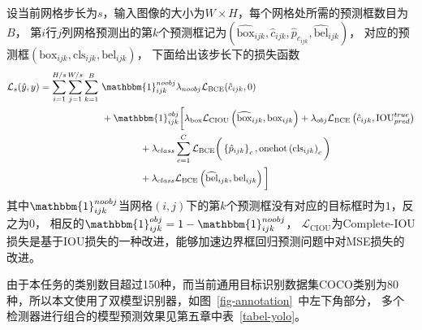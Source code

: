 \begin{definition}[目标识别损失函数]
设当前网格步长为$s$，输入图像的大小为$W\times H$，每个网格处所需的预测框数目为$B$，\vspace{0.5ex}
第$i$行$j$列网格预测出的第$k$个预测框记为$\left(\widehat{\text{box}}_{ijk},\hat{c}_{ijk}, \hat{p}_{c_{ijk}}, \widehat{\text{bel}}_{ijk}\right)$，
对应的预测框$\left(\text{box}_{ijk}, \text{cls}_{ijk}, \text{bel}_{ijk}\right)$，\vspace{0.5ex}
下面给出该步长下的损失函数
\begin{equation}
\begin{aligned}
\mathcal{L}_{s}(\hat{y}, y) = 
\sum_{i=1}^{H/s}\sum_{j=1}^{W/s}\sum_{k=1}^B&\ \mathbbm{1}^{noobj}_{ijk}\lambda_{noobj}\mathcal{L}_{\text{BCE}}(\hat{c}_{ijk},0)\\
&\ +\mathbbm{1}^{obj}_{ijk}\bigg[\lambda_{\text{box}}\mathcal{L}_{\text{CIOU}}\left(\widehat{\text{box}}_{ijk},\text{box}_{ijk}\right)+
\lambda_{obj}\mathcal{L}_{\text{BCE}}\left(\hat{c}_{ijk},\text{IOU}_{pred}^{true}\right)\\
&\ \qquad\qquad+\lambda_{class}\sum_{c=1}^{C}\mathcal{L}_{\text{BCE}}\bigg(\left\{\hat{p}_{ijk}\right\}_c, \text{onehot}\left(\text{cls}_{ijk}\right)_c\bigg)\\
&\ \qquad\qquad+\lambda_{class}\mathcal{L}_{\text{BCE}}\left(\widehat{\text{bel}}_{ijk}, \text{bel}_{ijk}\right)\bigg]
\end{aligned}
\end{equation}
其中$\mathbbm{1}^{noobj}_{ijk}$当网格$(i,j)$下的第$k$个预测框没有对应的目标框时为$1$，反之为$0$，
相反的$\mathbbm{1}^{obj}_{ijk} = 1-\mathbbm{1}^{noobj}_{ijk}$，
$\mathcal{L}_{\text{CIOU}}$为Complete-IOU损失是基于IOU损失的一种改进，能够加速边界框回归预测问题中对MSE损失的改进。
\end{definition}

由于本任务的类别数目超过150种，而当前通用目标识别数据集COCO类别为80种，所以本文使用了双模型识别器，如图~\ref{fig-annotation}~中左下角部分，
多个检测器进行组合的模型预测效果见第五章中表~\ref{tabel-yolo}。

